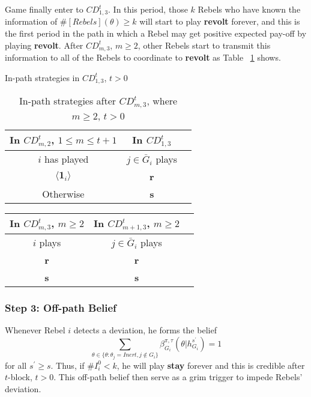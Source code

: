 \documentclass[12pt,letter]{article}
\theoremstyle{definition}
\theoremstyle{remark}
\theoremstyle{claim}
\begin{document}
Game finally enter to $CD^t_{1,3}$. In this period, those $k$ Rebels who have known the information of $\#[Rebels](\theta)\geq k$ will start to play \textbf{revolt} forever, and this is the first period in the path in which a Rebel may get positive expected pay-off by playing \textbf{revolt}. After $CD^t_{m,3}$, $m\geq 2$, other Rebels start to transmit this information to all of the Rebels to coordinate to \textbf{revolt} as Table ~\ref{Table_stg_cdm3} shows.

\begin{table}[ht]
\caption{In-path strategies in $CD^t_{1,3}$, $t>0$}
\label{Table_stg_cd13}
\begin{center}
\begin{tabular}{c c c}
In $CD^t_{m,2}$, $1\leq m\leq t+1$ 	 	&  	In $CD^t_{1,3}$		& 	\\
\hline
\hline
$i$ has played 		  							&  $j\in \bar{G}_{i}$ plays  								& \\
\hline
$\langle \mathbf{1}_i \rangle$ 	& 	\textbf{r}	    &  \\
Otherwise		&  \textbf{s}	&  \\

\end{tabular}
\caption{In-path strategies after $CD^t_{m,3}$, where $m\geq 2$, $t>0$}
\label{Table_stg_cdm3}
\end{center}
\end{table}

\begin{table}[ht]
\begin{center}
\begin{tabular}{c c c}
In $CD^t_{m,3}$, $m\geq 2$ 	 	&  	In $CD^t_{m+1,3}$, $m\geq 2$		& 	\\
\hline
\hline
$i$ plays 		  							&  $j\in \bar{G}_{i}$ plays  								& \\
\hline
\textbf{r} 	& 	\textbf{r}	    &  \\
\textbf{s}		&  \textbf{s}	&  \\

\end{tabular}
\end{center}
\end{table}



\subsubsection{Step 3: Off-path Belief}

Whenever Rebel $i$ detects a deviation, he forms the belief 
\begin{equation}
\label{eq_grim_trigger}
\sum_{\theta \in \{\theta:\theta_j=Inert,j\notin G_i\}}\beta^{\pi,\tau}_{G_i}({\theta}|h^{s^{'}}_{G_i})=1
\end{equation}
for all $s^{'}\geq s$. Thus, if $\# I^0_i<k$, he will play \textbf{stay} forever and this is credible after $t$-block, $t>0$. This off-path belief then serve as a grim trigger to impede Rebels' deviation. 
\end{document}
